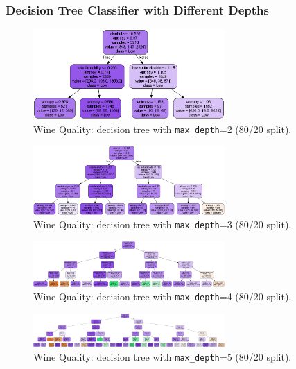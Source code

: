 \clearpage
\subsubsection*{Decision Tree Classifier with Different Depths}
\begin{figure}[H]
	\centering
	\includegraphics[width=0.65\textwidth]{imgs/dt-mini/dt__wine_quality__80_vs_20__2.png}
	\caption{Wine Quality: decision tree with \texttt{max\_depth}=2 (80/20 split).}\label{fig:wq-dt-depth-2}
\end{figure}

\begin{figure}[H]
	\centering
	\includegraphics[width=0.65\textwidth]{imgs/dt-mini/dt__wine_quality__80_vs_20__3.png}
	\caption{Wine Quality: decision tree with \texttt{max\_depth}=3 (80/20 split).}\label{fig:wq-dt-depth-3}
\end{figure}

\begin{figure}[H]
	\centering
	\includegraphics[width=0.65\textwidth]{imgs/dt-mini/dt__wine_quality__80_vs_20__4.png}
	\caption{Wine Quality: decision tree with \texttt{max\_depth}=4 (80/20 split).}\label{fig:wq-dt-depth-4}
\end{figure}

\begin{figure}[H]
	\centering
	\includegraphics[width=0.65\textwidth]{imgs/dt-mini/dt__wine_quality__80_vs_20__5.png}
	\caption{Wine Quality: decision tree with \texttt{max\_depth}=5 (80/20 split).}\label{fig:wq-dt-depth-5}
\end{figure}

